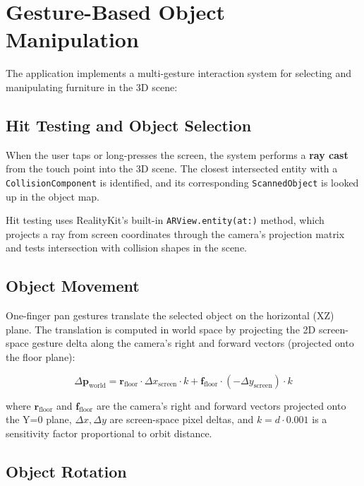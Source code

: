 \section{Gesture-Based Object Manipulation}
\label{sec:gestures}

The application implements a multi-gesture interaction system for selecting and manipulating furniture in the 3D scene:

\subsection{Hit Testing and Object Selection}

When the user taps or long-presses the screen, the system performs a \textbf{ray cast} from the touch point into the 3D scene. The closest intersected entity with a \texttt{CollisionComponent} is identified, and its corresponding \texttt{ScannedObject} is looked up in the object map.

Hit testing uses RealityKit's built-in \texttt{ARView.entity(at:)} method, which projects a ray from screen coordinates through the camera's projection matrix and tests intersection with collision shapes in the scene.

\subsection{Object Movement}

One-finger pan gestures translate the selected object on the horizontal (XZ) plane. The translation is computed in world space by projecting the 2D screen-space gesture delta along the camera's right and forward vectors (projected onto the floor plane):

\[
    \Delta\mathbf{p}_{\text{world}} = \mathbf{r}_{\text{floor}} \cdot \Delta x_{\text{screen}} \cdot k + \mathbf{f}_{\text{floor}} \cdot (-\Delta y_{\text{screen}}) \cdot k
\]

where $\mathbf{r}_{\text{floor}}$ and $\mathbf{f}_{\text{floor}}$ are the camera's right and forward vectors projected onto the Y=0 plane, $\Delta x, \Delta y$ are screen-space pixel deltas, and $k = d \cdot 0.001$ is a sensitivity factor proportional to orbit distance.

\subsection{Object Rotation}

